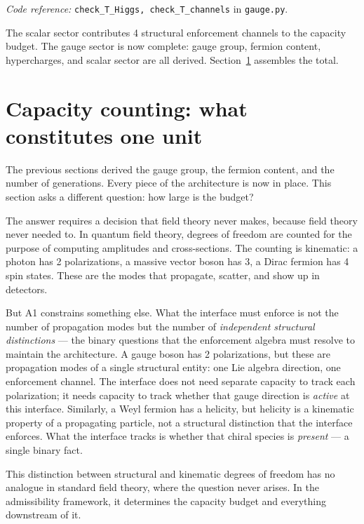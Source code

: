 \documentclass[11pt]{article}
\newcommand{\coderef}[2]{\smallskip\noindent\textit{Code reference:} \texttt{#1} in \texttt{#2}.}
\begin{document}
\coderef{check\_T\_Higgs, check\_T\_channels}{gauge.py}

The scalar sector contributes 4 structural enforcement channels to the capacity budget.  The gauge sector is now complete: gauge group, fermion content, hypercharges, and scalar sector are all derived.  Section~\ref{sec:counting} assembles the total.


\section{Capacity counting: what constitutes one unit}
\label{sec:counting}

The previous sections derived the gauge group, the fermion content, and the number of generations.  Every piece of the architecture is now in place.  This section asks a different question: how large is the budget?

The answer requires a decision that field theory never makes, because field theory never needed to.  In quantum field theory, degrees of freedom are counted for the purpose of computing amplitudes and cross-sections.  The counting is kinematic: a photon has 2 polarizations, a massive vector boson has 3, a Dirac fermion has 4 spin states.  These are the modes that propagate, scatter, and show up in detectors.

But A1 constrains something else.  What the interface must enforce is not the number of propagation modes but the number of \emph{independent structural distinctions} --- the binary questions that the enforcement algebra must resolve to maintain the architecture.  A gauge boson has 2 polarizations, but these are propagation modes of a single structural entity: one Lie algebra direction, one enforcement channel.  The interface does not need separate capacity to track each polarization; it needs capacity to track whether that gauge direction is \emph{active} at this interface.  Similarly, a Weyl fermion has a helicity, but helicity is a kinematic property of a propagating particle, not a structural distinction that the interface enforces.  What the interface tracks is whether that chiral species is \emph{present} --- a single binary fact.

This distinction between structural and kinematic degrees of freedom has no analogue in standard field theory, where the question never arises.  In the admissibility framework, it determines the capacity budget and everything downstream of it.
\end{document}
